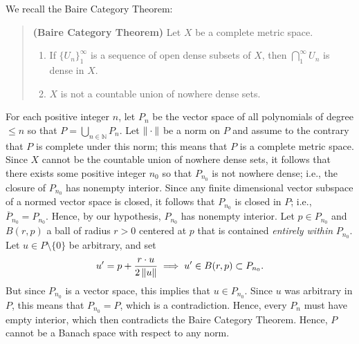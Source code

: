 \documentclass{article}
\begin{document}
\begin{solutions}
	We recall the Baire Category Theorem: 
		\begin{quote}
			\textbf{(Baire Category Theorem)} Let $X$ be a complete metric space. \vspace{-0.35cm}
				\begin{enumerate}[itemsep =-2pt,label = (\alph{*})]
					\item If $\{U_{n}\}_{1}^{\infty}$ is a sequence of open dense subsets of $X$, then $\bigcap_{1}^{\infty}U_{n}$ is dense in $X$. 
					\item $X$ is not a countable union of nowhere dense sets. 
				\end{enumerate}
		\end{quote}
	For each positive integer $n$, let $P_{n}$ be the vector space of all polynomials of degree $\leq n$ so that $P = \bigcup_{n \in \mathbb{N}}P_{n}$. Let $\left\Vert \hspace{2pt}\cdot\hspace{2pt} \right\Vert$ be a norm on $P$ and assume to the contrary that $P$ is complete under this norm; this means that $P$ is a complete metric space. Since $X$ cannot be the countable union of nowhere dense sets, it follows that there exists some positive integer $n_{0}$ so that $P_{n_{0}}$ is not nowhere dense; i.e., the closure of $P_{n_{0}}$ has nonempty interior. Since any finite dimensional vector subspace of a normed vector space is closed, it follows that $P_{n_{0}}$ is closed in $P$; i.e., $\overline{P}_{n_{0}} = P_{n_{0}}$. Hence, by our hypothesis, $P_{n_{0}}$ has nonempty interior. Let $p \in P_{n_{0}}$ and $B(r, p)$ a ball of radius $r > 0$ centered at $p$ that is contained \textit{entirely within} $P_{n_{0}}$. Let $u \in P\setminus \{0\}$ be arbitrary, and set 
		\begin{equation}
			u' = p + \frac{r \cdot u}{2\left\Vert u \right\Vert} \implies u' \in B(r, p) \subset P_{n_{0}}. 
		\end{equation}
	But since $P_{n_{0}}$ is a vector space, this implies that $u \in P_{n_{0}}$. Since $u$ was arbitrary in $P$, this means that $P_{n_{0}}= P$, which is a contradiction. Hence, every $P_{n}$ must have empty interior, which then contradicts the Baire Category Theorem. Hence, $P$ cannot be a Banach space with respect to any norm. 
\end{solutions}
\end{document}
